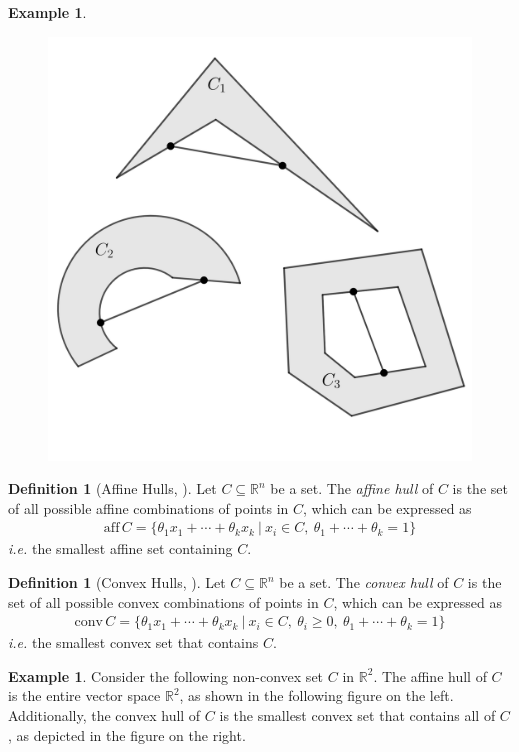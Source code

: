 \documentclass[11pt,reqno]{amsart}
\newcommand{\R}{\mathbb{R}}
\newcommand{\aff}{\mathrm{aff\,}}
\newcommand{\conv}{\mathrm{conv\,}}
\theoremstyle{plain}
\theoremstyle{definition}
\newtheorem{example}[theorem]{Example}
\newtheorem{definition}[theorem]{Definition}
\begin{document}
{\begin{example}
\begin{figure}[h]
\begin{minipage}{.5\textwidth}
      \label{fig:test1}
    \end{minipage}%
    \begin{minipage}{.5\textwidth}
      \centering
      \includegraphics[height = 1.7 in]{notconvex.png}
      \label{fig:test2}
    \end{minipage}
    \end{figure}
\end{example}
\smallskip
\begin{definition}[{Affine Hulls, \cite[2.1.2]{boyd_vandenberghe_2004}}]
    Let $C\subseteq\R^n$ be a set. The \emph{affine hull} of $C$ is the set of all possible affine combinations of points in $C$, which can be expressed as
    \begin{align*}
        \aff C = \{\theta_1x_1+\cdots+\theta_kx_k\ |\ x_i\in C,\ \theta_1+\cdots+\theta_k=1\}
    \end{align*}
    \emph{i.e.} the smallest affine set containing $C$.
\end{definition}
\smallskip
\begin{definition}[{Convex Hulls, \cite[2.1.4]{boyd_vandenberghe_2004}}]
    Let $C\subseteq\R^n$ be a set. The \emph{convex hull} of $C$ is the set of all possible convex combinations of points in $C$, which can be expressed as
    \begin{align*}
        \conv C = \{\theta_1x_1+\cdots+\theta_kx_k\ |\ x_i\in C,\ \theta_i\geq 0,\ \theta_1+\cdots+\theta_k=1\}
    \end{align*}
    \emph{i.e.} the smallest convex set that contains $C$.
\end{definition}
\smallskip
\begin{example}
    Consider the following non-convex set $C$ in $\R^2$. The affine hull of $C$ is the entire vector space $\R^2$, as shown in the following figure on the left. Additionally, the convex hull of $C$ is the smallest convex set that contains all of $C$, as depicted in the figure on the right.
    \begin{figure}[h]

\end{figure}
\end{example}}
\end{document}
